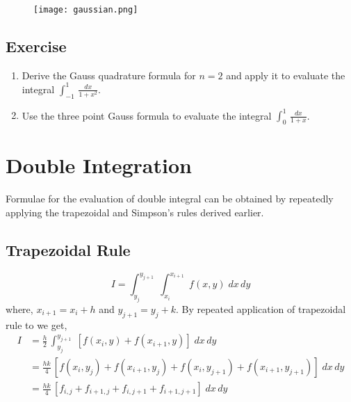 \documentclass[aima203_lecturenotes_ku.tex]{subfiles}
\begin{document}
\begin{figure}[h]
  \centering
\texttt{[image: gaussian.png]}
\end{figure}
\subsection{Exercise}
\begin{enumerate}
\item Derive the Gauss quadrature formula for $n=2$ and apply it to evaluate the integral $\displaystyle \int_{-1}^1 \, \frac{dx}{1+x^2}$.

\item Use the three point Gauss formula to evaluate the integral $\displaystyle \int_0^1 \, \frac{dx}{1+x}$.
\end{enumerate}
\section{Double Integration}
Formulae for the evaluation of double integral can be obtained by repeatedly applying the trapezoidal and Simpson's rules derived earlier.
\subsection{Trapezoidal Rule}
\begin{equation*}
  I = \int_{y_j}^{y_{j+1}}\; \int_{x_i}^{x_{i+1}} \; f(x,y)\;dx\,dy
\end{equation*}
where, $x_{i+1} = x_i + h$ and $y_{j+1} = y_j + k$.
By repeated application of trapezoidal rule to we get,
\begin{equation}
  \label{trapdouble}
  \begin{aligned}
    I &= \frac{h}{2} \,\int_{y_j}^{y_{j+1}}\; [f(x_i,y) + f(x_{i+1},y) ]\;dx\,dy \\[1mm]
      &= \frac{hk}{4} \, [f(x_i,y_j) + f(x_{i+1},y_j) + f(x_i,y_{j+1}) + f(x_{i+1},y_{j+1}) ]\;dx\,dy \\[1mm]
      &= \frac{hk}{4} \, [f_{i,j} + f_{i+1, j} + f_{i,j+1} + f_{i+1,j+1} ]\;dx\,dy
  \end{aligned}
\end{equation}
\end{document}
